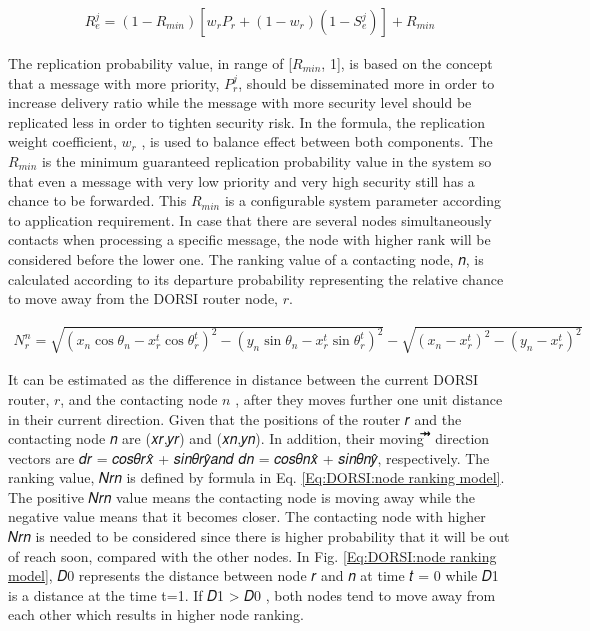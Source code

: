 \begin{eqnarray}
\label{Eq:DORSI:replication probability}
{ R }_{ e }^{ j }=(1-{ R }_{ min })[{ w }_{ r }{ P }_{ r }+(1-{ w }_{ r })(1-{ S }_{ e }^{ j })]+{ R }_{ min }
\end{eqnarray}

The replication probability value, in range of [${ R }_{ min }$, 1], is based on the concept that a message with
more priority, $P_r^j$, should be disseminated more in order to increase delivery ratio while the message with more security level should be replicated less in order to tighten security risk. 
In the formula, the replication weight coefficient, $w_r$ , is used to balance effect between both components. 
The ${ R }_{ min }$ is the minimum guaranteed replication probability value in the system so that even a message with very low priority and very high security still has a chance to be forwarded. 
This ${ R }_{ min }$ is a configurable system parameter according to application requirement.
In case that there are several nodes simultaneously contacts when processing a specific message, the node with higher rank will be considered before the lower one. 
The ranking value of a contacting node, 𝑛, is calculated according to its departure probability representing the relative chance to move away from the DORSI router node, $r$.

\begin{eqnarray}
\label{Eq:DORSI:node ranking model}
{ N }_{ r }^{ n }=\sqrt { { ({ x }_{ n }\cos { { \theta  }_{ n } } -{ x }_{ r }^{ t }\cos { { \theta  }_{ r }^{ t } } ) }^{ 2 }-{ ({ y }_{ n }\sin { { \theta  }_{ n } } -{ x }_{ r }^{ t }\sin { { \theta  }_{ r }^{ t } } ) }^{ 2 } } -\sqrt { { ({ x }_{ n }-{ x }_{ r }^{ t }) }^{ 2 }-{ ({ y }_{ n }-{ x }_{ r }^{ t }) }^{ 2 } } 
\end{eqnarray}

It can be estimated as the difference in distance between the current DORSI router, $r$, and the contacting node $n$ , after they moves further one unit distance in their current direction. 
Given that the positions of the router 𝑟 and the contacting node 𝑛 are (𝑥𝑟,𝑦𝑟) and (𝑥𝑛,𝑦𝑛). In addition, their moving
⃗⃗ ⃗⃗⃗⃗
direction vectors are 𝑑𝑟 = 𝑐𝑜𝑠𝜃𝑟𝑥̂ + 𝑠𝑖𝑛𝜃𝑟𝑦̂𝑎𝑛𝑑 𝑑𝑛 = 𝑐𝑜𝑠𝜃𝑛𝑥̂ + 𝑠𝑖𝑛𝜃𝑛𝑦̂, respectively. The ranking
value, 𝑁𝑟𝑛 is defined by formula in Eq. \ref{Eq:DORSI:node ranking model}. The positive 𝑁𝑟𝑛 value means the contacting node is moving away while the negative value means that it becomes closer. The contacting node with higher 𝑁𝑟𝑛 is needed to be considered since there is higher probability that it will be out of reach soon, compared with the other nodes. In Fig. \ref{Eq:DORSI:node ranking model}, 𝐷0 represents the distance between node 𝑟 and 𝑛 at time 𝑡 = 0 while 𝐷1 is a distance at the time t=1. If 𝐷1 > 𝐷0 , both nodes tend to move away from each other which results in higher node ranking.

